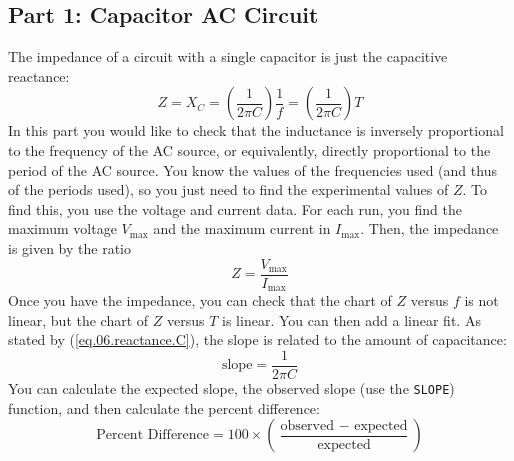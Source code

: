 \subsection{Part 1: Capacitor AC Circuit}
The impedance of a circuit with a single capacitor is just the capacitive reactance:
\begin{equation}
	Z = X_{C} = \left(\frac{1}{2 \pi C}\right) \frac{1}{f} = \left(\frac{1}{2 \pi C}\right) T
\end{equation}
In this part you would like to check that the inductance is inversely proportional to the frequency of the AC source, or equivalently, directly proportional to the period of the AC source. You know the values of the frequencies used (and thus of the periods used), so you just need to find the experimental values of $Z$. To find this, you use the voltage and current data. For each run, you find the maximum voltage $V_{\text{max}}$ and the maximum current in $I_{\text{max}}$. Then, the impedance is given by the ratio
\begin{equation}
	Z = \frac{V_{\text{max}}}{I_{\text{max}}}
\end{equation}
Once you have the impedance, you can check that the chart of $Z$ versus $f$ is not linear, but the chart of $Z$ versus $T$ is linear. You can then add a linear fit. As stated by (\ref{eq.06.reactance.C}), the slope is related to the amount of capacitance:
\begin{equation}
	\text{slope} = \frac{1}{2 \pi C}
\end{equation}
You can calculate the expected slope, the observed slope (use the \texttt{SLOPE}) function, and then calculate the percent difference:
\begin{equation}
	\text{Percent Difference} = 100 \times \left( \frac{\text{observed } - \text{ expected}}{\text{expected}} \right)
\end{equation}
